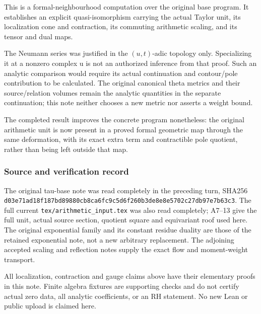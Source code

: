 This is a formal-neighbourhood computation over the original base program. It establishes an explicit quasi-isomorphism carrying the actual Taylor unit, its localization cone and contraction, its commuting arithmetic scaling, and its tensor and dual maps.

The Neumann series was justified in the \((u,t)\)-adic topology only. Specializing it at a nonzero complex u is not an authorized inference from that proof. Such an analytic comparison would require its actual continuation and contour/pole contribution to be calculated. The original canonical theta metrics and their source/relation volumes remain the analytic quantities in the separate continuation; this note neither chooses a new metric nor asserts a weight bound.

The completed result improves the concrete program nonetheless: the original arithmetic unit is now present in a proved formal geometric map through the same deformation, with its exact extra term and contractible pole quotient, rather than being left outside that map.

\subsubsection{Source and verification record}\label{endpoint-f1_unit_gauge--source-and-verification-record}

The original tau-base note was read completely in the preceding turn, SHA256 \nolinkurl{d03e71ad18f187bd89880cb8ca6fc9c5d6f260b3de8e8e5702c27db97e7b63c3}. The full current \nolinkurl{tex/arithmetic_input.tex} was also read completely; A7--13 give the full unit, actual source section, quotient square and equivariant roof used here. The original exponential family and its constant residue duality are those of the retained exponential note, not a new arbitrary replacement. The adjoining accepted scaling and reflection notes supply the exact flow and moment-weight transport.

All localization, contraction and gauge claims above have their elementary proofs in this note. Finite algebra fixtures are supporting checks and do not certify actual zero data, all analytic coefficients, or an RH statement. No new Lean or public upload is claimed here.

